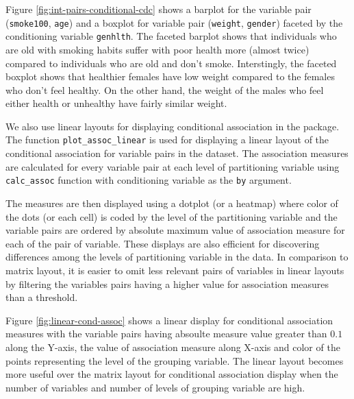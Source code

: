 Figure \ref{fig:int-pairs-conditional-cdc} shows a barplot for the
variable pair (\texttt{smoke100}, \texttt{age}) and a boxplot for
variable pair (\texttt{weight}, \texttt{gender}) faceted by the
conditioning variable \texttt{genhlth}. The faceted barplot shows that
individuals who are old with smoking habits suffer with poor health more
(almost twice) compared to individuals who are old and don't smoke.
Interstingly, the faceted boxplot shows that healthier females have low
weight compared to the females who don't feel healthy. On the other
hand, the weight of the males who feel either health or unhealthy have
fairly similar weight.

We also use linear layouts for displaying conditional association in the
package. The function \texttt{plot\_assoc\_linear} is used for
displaying a linear layout of the conditional association for variable
pairs in the dataset. The association measures are calculated for every
variable pair at each level of partitioning variable using
\texttt{calc\_assoc} function with conditioning variable as the
\texttt{by} argument.

The measures are then displayed using a dotplot (or a heatmap) where
color of the dots (or each cell) is coded by the level of the
partitioning variable and the variable pairs are ordered by absolute
maximum value of association measure for each of the pair of variable.
These displays are also efficient for discovering differences among the
levels of partitioning variable in the data. In comparison to matrix
layout, it is easier to omit less relevant pairs of variables in linear
layouts by filtering the variables pairs having a higher value for
association measures than a threshold.

Figure \ref{fig:linear-cond-assoc} shows a linear display for
conditional association measures with the variable pairs having absoulte
measure value greater than \(0.1\) along the Y-axis, the value of
association measure along X-axis and color of the points representing
the level of the grouping variable. The linear layout becomes more
useful over the matrix layout for conditional association display when
the number of variables and number of levels of grouping variable are
high.

